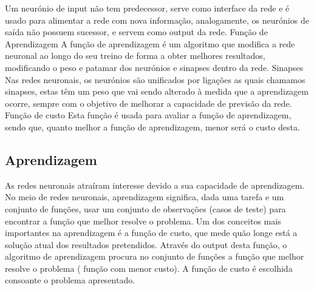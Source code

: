 Um neurónio de input não tem predecessor, serve como interface da rede e é usado para alimentar a rede com nova informação, analogamente, os neurónios de saída não possuem sucessor, e servem como output da rede.
Função de Aprendizagem
A função de aprendizagem é um algoritmo que modifica a rede neuronal ao longo do seu treino de forma a obter melhores resultados, modificando o peso e patamar dos neurónios e sinapses dentro da rede.
Sinapses
Nas redes neuronais, os neurónios são unificados por ligações as quais chamamos sinapses, estas têm um peso que vai sendo alterado à medida que a aprendizagem ocorre, sempre com o objetivo de melhorar a capacidade de previsão da rede.
Função de custo
Esta função é usada para avaliar a função de aprendizagem, sendo que, quanto melhor a função de aprendizagem, menor será o custo desta.
 
\subsection{Aprendizagem}

As redes neuronais atraíram interesse devido a sua capacidade de aprendizagem. 
No meio de redes neuronais, aprendizagem significa, dada uma tarefa e um conjunto de funções, usar um conjunto de observações (casos de teste) para encontrar a função que melhor resolve o problema.
Um dos conceitos mais importantes na aprendizagem é a função de custo, que mede quão longe está a solução atual dos resultados pretendidos. Através do output desta função, o algoritmo de aprendizagem procura no conjunto de funções a função que melhor resolve o problema ( função com menor custo).
A função de custo é escolhida consoante o problema apresentado.
